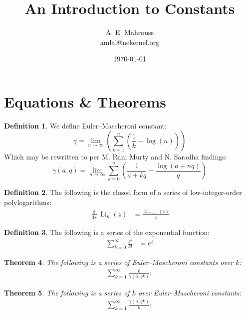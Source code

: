 \documentclass[10pt, twocolumn]{article}
\title{%
	\vspace{-1.5em}%
	\large\textbf{An Introduction to Constants}%
}
\author{A. E. Mahrouss\\amlal@nekernel.org}
\date{\today}
\theoremstyle{plain}
\newtheorem{theorem}{Theorem}[section]
\theoremstyle{definition}
\newtheorem{definition}[theorem]{Definition}
\theoremstyle{remark}
\begin{document}
	
	\twocolumn[{%
		\maketitle
		\vspace{-0.5em}
		\vspace{0.8em}
		\rule{\linewidth}{0.4pt}
		\vspace{1em}
	}]
	
	
	\section{Equations \& Theorems}
	
	\begin{definition}
		We define Euler–Mascheroni constant:
		\begin{equation}
			\gamma = \lim_{n \to \infty}(\sum_{k=1}^{n}(\frac{1}{k}-\log(n)))
		\end{equation}
		Which may be rewritten to per M. Ram Murty and N. Saradha findings:
		\begin{equation}
			\gamma(a, q) = \lim_{n \to \infty}\sum_{k=0}^{n}(\frac{1}{a+kq}-\frac{\log(a+nq)}{q})
		\end{equation}
	\end{definition}
	
	\begin{definition}
		The following is the closed form of a series of low-integer-order polylogarithms:
		\begin{align*}
			\frac{\operatorname{d}}{\operatorname{dz}} \operatorname{Li}_{n}(z) &= \frac{\operatorname{Li}_{n-1}(z)}{z}
		\end{align*}
	\end{definition}
	
	\begin{definition}
		The following is a series of the exponential function:
		\begin{align*}
			\sum_{k=0}^{\infty} \frac{z^k}{k!} &= e^{z}
		\end{align*}
	\end{definition}
	
	\begin{theorem}
		The following is a series of Euler–Mascheroni constants over $k$:
		\begin{align*}
			\sum_{k=1}^{\infty} \frac{k}{\gamma(a, qk)};
		\end{align*}
	\end{theorem}
	
	\begin{theorem}
		The following is a series of $k$ over Euler–Mascheroni constants:
		\begin{align*}
			\sum_{k=1}^{\infty} \frac{\gamma(a, qk)}{k};
		\end{align*}
	\end{theorem}
	
\end{document}
